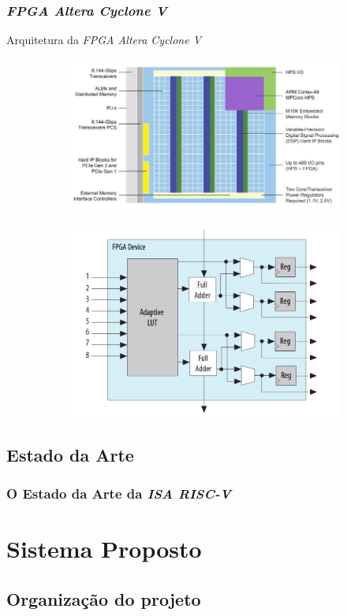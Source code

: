 \documentclass{beamer}
\begin{document}
    \begin{frame}
        \frametitle{\textit{FPGA Altera Cyclone V}}
        \begin{block}{Arquitetura da \textit{FPGA Altera Cyclone V}}
        \begin{figure}[H]
            \begin{subfigure}
            \centering
                \includegraphics[width=.5\textwidth,height=.5\textheight,keepaspectratio]{../images/altera_cyclone_v_soc_architectural_downscale.jpg}
            \end{subfigure}
            \begin{subfigure}
            \centering
                \includegraphics[width=.4\textwidth,height=.5\textheight,keepaspectratio]{../images/intel_alm_high_level.png}
            \end{subfigure}
        \end{figure}
        \end{block}
    \end{frame}

    \subsection{Estado da Arte}
    \begin{frame}
        \frametitle{O Estado da Arte da \textit{ISA RISC-V}}
    \end{frame}

\section{Sistema Proposto}
    \subsection{Organização do projeto}



    \begin{frame}
        \frametitle{}
    \end{frame}

    \begin{frame}
        \frametitle{}
    \end{frame}

    \begin{frame}
        \frametitle{}
    \end{frame}

    \begin{frame}
        \frametitle{}
    \end{frame}
\end{document}
